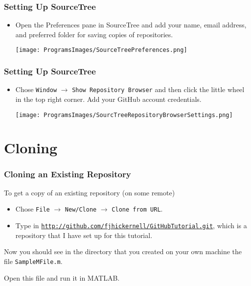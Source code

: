 \documentclass[12pt, compress,xcolor={usenames,dvipsnames}]{beamer} %
\newcommand{\Matlab}{MATLAB\xspace}
\begin{document}
\begin{frame}\frametitle{Setting Up SourceTree}
	
	\vspace{-4ex}
	
	\begin{itemize}
				
		\item Open the Preferences pane in SourceTree and add your name, email address, and preferred folder for saving copies of repositories.
		
		\texttt{[image: ProgramsImages/SourceTreePreferences.png]}
	\end{itemize}
	
\end{frame}

\begin{frame}\frametitle{Setting Up SourceTree}
	
	\vspace{-4ex}
	
	\begin{itemize}
		
		\item Chose \texttt{Window} $\rightarrow$ \texttt{Show Repository Browser} and then click the little wheel in the top right corner.  Add your GitHub account credentials.
		
		\texttt{[image: ProgramsImages/SourcTreeRepositoryBrowserSettings.png]}
	\end{itemize}
	
\end{frame}

\section{Cloning}

\begin{frame}\frametitle{Cloning an Existing Repository}
	
	To get a copy of an existing repository (on some remote)
	
	\begin{itemize}
		
		\item Chose \texttt{File} $\rightarrow$ \texttt{New/Clone} $\rightarrow$ \texttt{Clone from URL}.
		
		\item Type in \href{http://github.com/fjhickernell/GitHubTutorial.git}{\nolinkurl{http://github.com/fjhickernell/GitHubTutorial.git}}, which is a repository that I have set up for this tutorial.
		
	\end{itemize}
	
	Now you should see in the directory that you created on your own machine the file \texttt{SampleMFile.m}.
	
	Open this file and run it in \Matlab.
	
\end{frame}
\end{document}
